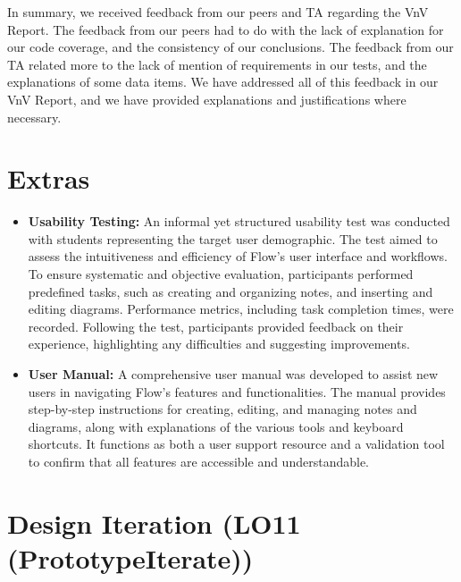 \documentclass{article}
\begin{document}
In summary, we received feedback from our peers and TA regarding the VnV Report.
The feedback from our peers had to do with the lack of explanation for our code
coverage, and the consistency of our conclusions. The feedback from our TA
related more to the lack of mention of requirements in our tests, and the
explanations of some data items. We have addressed all of this feedback in our
VnV Report, and we have provided explanations and justifications where necessary.

\section{Extras}


\begin{itemize}
\item \textbf{Usability Testing:} An informal yet structured usability test was 
conducted with students representing the target user demographic. The test aimed 
to assess the intuitiveness and efficiency of Flow's user interface and 
workflows. To ensure systematic and objective evaluation, participants performed 
predefined tasks, such as creating and organizing notes, and inserting and 
editing diagrams. Performance metrics, including task completion times, were 
recorded. Following the test, participants provided feedback on their experience, 
highlighting any difficulties and suggesting improvements.

\item \textbf{User Manual:} A comprehensive user manual was developed to assist 
new users in navigating Flow's features and functionalities. The manual provides 
step-by-step instructions for creating, editing, and managing notes and diagrams,
along with explanations of the various tools and keyboard shortcuts. It functions 
as both a user support resource and a validation tool to confirm that all 
features are accessible and understandable.
\end{itemize}

\section{Design Iteration (LO11 (PrototypeIterate))}
\end{document}
